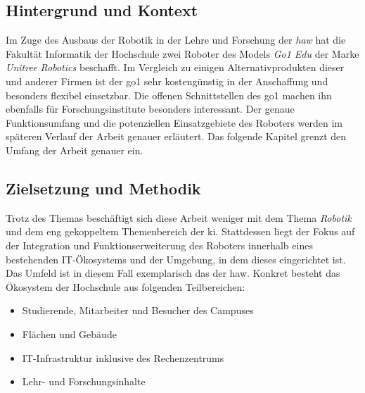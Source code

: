 \subsection{Hintergrund und Kontext}\label{subsec:hintergrund-und-kontext}

Im Zuge des Ausbaus der Robotik in der Lehre und Forschung der \emph{\gls{haw}} hat
die Fakultät Informatik der Hochschule zwei Roboter des Models \emph{Go1 Edu} der Marke \emph{Unitree Robotics} beschafft.
Im Vergleich zu einigen Alternativprodukten dieser und anderer Firmen ist der \gls{go1} sehr kostengünstig in der Anschaffung und besonders flexibel einsetzbar.
Die offenen Schnittstellen des \gls{go1} machen ihn ebenfalls für Forschungsinstitute besonders interessant.
Der genaue Funktionsumfang und die potenziellen Einsatzgebiete des Roboters werden im späteren Verlauf der Arbeit genauer erläutert.
Das folgende Kapitel grenzt den Umfang der Arbeit genauer ein.

\subsection{Zielsetzung und Methodik}

Trotz des Themas \emph{\mytitle} beschäftigt sich diese Arbeit weniger mit dem Thema \emph{Robotik} und
dem eng gekoppeltem Themenbereich der \gls{ki}.
Stattdessen liegt der Fokus auf der Integration und Funktionserweiterung des Roboters innerhalb eines
bestehenden IT-Ökosystems und der Umgebung, in dem dieses eingerichtet ist.
Das Umfeld ist in diesem Fall exemplarisch das der \gls{haw}.
Konkret besteht das Ökosystem der Hochschule aus folgenden Teilbereichen:

\begin{itemize}
    \item Studierende, Mitarbeiter und Besucher des Campuses
    \item Flächen und Gebäude
    \item IT-Infrastruktur inklusive des Rechenzentrums
    \item Lehr- und Forschungsinhalte
\end{itemize}

